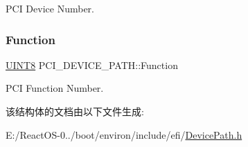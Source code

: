 P\+CI Device Number. \mbox{\label{struct_p_c_i___d_e_v_i_c_e___p_a_t_h_aeb5b1b697ed4cd648567150e2e00f718}} 
\subsubsection{\texorpdfstring{Function}{Function}}
{\footnotesize\ttfamily \hyperlink{_processor_bind_8h_ab27e9918b538ce9d8ca692479b375b6a}{U\+I\+N\+T8} P\+C\+I\+\_\+\+D\+E\+V\+I\+C\+E\+\_\+\+P\+A\+T\+H\+::\+Function}

P\+CI Function Number. 

该结构体的文档由以下文件生成\+:\begin{DoxyCompactItemize}
\item 
E\+:/\+React\+O\+S-\/0../boot/environ/include/efi/\hyperlink{_device_path_8h}{Device\+Path.\+h}\end{DoxyCompactItemize}
